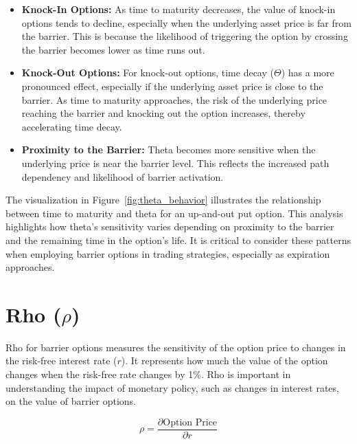 \begin{itemize}
    \item \textbf{Knock-In Options:} As time to maturity decreases, the value of knock-in options tends to decline, especially when the underlying asset price is far from the barrier. This is because the likelihood of triggering the option by crossing the barrier becomes lower as time runs out.
    
    \item \textbf{Knock-Out Options:} For knock-out options, time decay (\(\Theta\)) has a more pronounced effect, especially if the underlying asset price is close to the barrier. As time to maturity approaches, the risk of the underlying price reaching the barrier and knocking out the option increases, thereby accelerating time decay.
    
    \item \textbf{Proximity to the Barrier:} Theta becomes more sensitive when the underlying price is near the barrier level. This reflects the increased path dependency and likelihood of barrier activation.
\end{itemize}

The visualization in Figure~\ref{fig:theta_behavior} illustrates the relationship between time to maturity and theta for an up-and-out put option. This analysis highlights how theta's sensitivity varies depending on proximity to the barrier and the remaining time in the option's life. It is critical to consider these patterns when employing barrier options in trading strategies, especially as expiration approaches.


\section{Rho (\(\rho\))}

Rho for barrier options measures the sensitivity of the option price to changes in the risk-free interest rate (\(r\)). It represents how much the value of the option changes when the risk-free rate changes by 1\%. Rho is important in understanding the impact of monetary policy, such as changes in interest rates, on the value of barrier options.

\[
\rho = \frac{\partial \text{Option Price}}{\partial r}
\]

